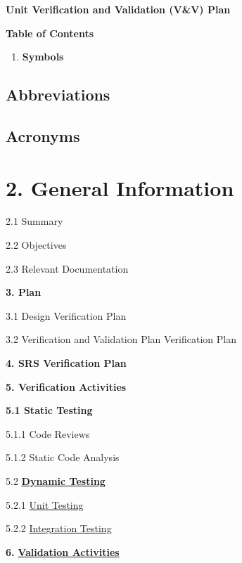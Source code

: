 \documentclass[
]{article}
\author{}
\date{}
\begin{document}
\textbf{Unit Verification and Validation (V\&V) Plan}

\textbf{Table of Contents}

\begin{enumerate}
\def\labelenumi{\arabic{enumi}.}
\item
  \textbf{Symbols}
\end{enumerate}

\hypertarget{abbreviations}{%
\subsection{\texorpdfstring{
Abbreviations}{ Abbreviations}}\label{abbreviations}}

\hypertarget{acronyms}{%
\subsection{\texorpdfstring{ Acronyms}{ Acronyms}}\label{acronyms}}

\hypertarget{general-information}{%
\section{\texorpdfstring{\textbf{2. General Information}
}{2. General Information }}\label{general-information}}

2.1 Summary

2.2 Objectives

2.3 Relevant Documentation

\textbf{3. Plan}

3.1 Design Verification Plan

3.2 Verification and Validation Plan Verification Plan

\textbf{4. SRS Verification Plan}

\textbf{5. Verification Activities}

\textbf{5.1 Static Testing}

5.1.1 Code Reviews

5.1.2 Static Code Analysis

5.2
\href{https://chat.openai.com/c/ea27b6f7-2398-4e80-ab95-d57a6a8c356f\#32-dynamic-testing}{\textbf{Dynamic
Testing}}

5.2.1
\href{https://chat.openai.com/c/ea27b6f7-2398-4e80-ab95-d57a6a8c356f\#321-unit-testing}{Unit
Testing}

5.2.2
\href{https://chat.openai.com/c/ea27b6f7-2398-4e80-ab95-d57a6a8c356f\#322-integration-testing}{Integration
Testing}

\textbf{6.}
\href{https://chat.openai.com/c/ea27b6f7-2398-4e80-ab95-d57a6a8c356f\#4-validation-activities}{\textbf{Validation
Activities}}
\end{document}
